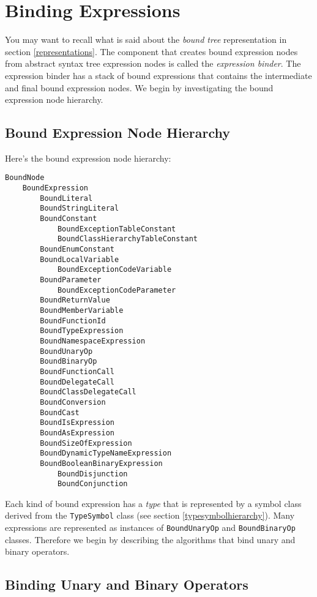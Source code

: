 \documentclass[a4paper,oneside,11pt]{book}
\theoremstyle{definition}
\begin{document}
\chapter{Binding Expressions}

You may want to recall what is said about the \emph{bound tree} representation in section \ref{representations}.
The component that creates bound expression nodes from abstract syntax tree expression nodes is called the \emph{expression binder}.
The expression binder has a stack of bound expressions that contains the intermediate and final bound expression nodes.
We begin by investigating the bound expression node hierarchy.

\section{Bound Expression Node Hierarchy}

Here's the bound expression node hierarchy:

\begin{verbatim}
BoundNode
    BoundExpression
        BoundLiteral
        BoundStringLiteral
        BoundConstant
            BoundExceptionTableConstant
            BoundClassHierarchyTableConstant
        BoundEnumConstant
        BoundLocalVariable
            BoundExceptionCodeVariable
        BoundParameter
            BoundExceptionCodeParameter
        BoundReturnValue
        BoundMemberVariable
        BoundFunctionId
        BoundTypeExpression
        BoundNamespaceExpression
        BoundUnaryOp
        BoundBinaryOp
        BoundFunctionCall
        BoundDelegateCall
        BoundClassDelegateCall
        BoundConversion
        BoundCast
        BoundIsExpression
        BoundAsExpression
        BoundSizeOfExpression
        BoundDynamicTypeNameExpression
        BoundBooleanBinaryExpression
            BoundDisjunction
            BoundConjunction
\end{verbatim}

Each kind of bound expression has a \emph{type} that is represented by a symbol class derived from the \verb|TypeSymbol| class
(see section \ref{typesymbolhierarchy}). Many expressions are represented as instances of \verb|BoundUnaryOp| and \verb|BoundBinaryOp| classes.
Therefore we begin by describing the algorithms that bind unary and binary operators.

\section{Binding Unary and Binary Operators}
\end{document}
